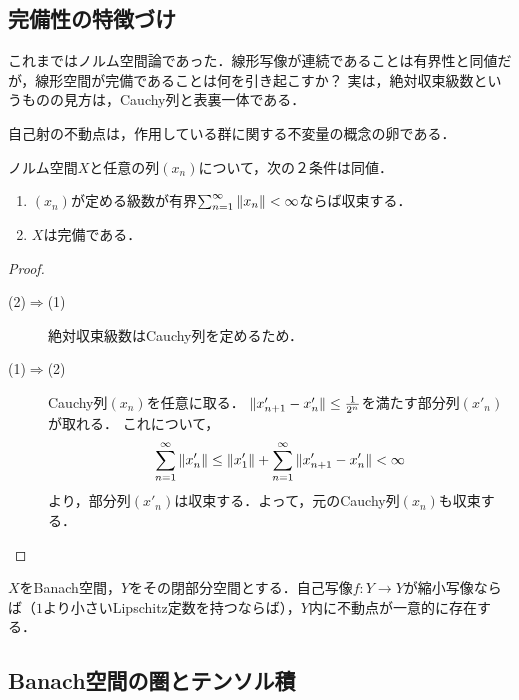 \documentclass[uplatex,dvipdfmx]{jsreport}
\begin{document}
\subsection{完備性の特徴づけ}

\begin{tcolorbox}[colframe=ForestGreen, colback=ForestGreen!10!white,breakable,colbacktitle=ForestGreen!40!white,coltitle=black,fonttitle=\bfseries\sffamily,
title=]
    これまではノルム空間論であった．線形写像が連続であることは有界性と同値だが，線形空間が完備であることは何を引き起こすか？
    実は，絶対収束級数というものの見方は，Cauchy列と表裏一体である．

    自己射の不動点は，作用している群に関する不変量の概念の卵である．
\end{tcolorbox}

\begin{theorem}[絶対収束級数なるクラスの定義]
    ノルム空間$X$と任意の列$(x_n)$について，次の２条件は同値．
    \begin{enumerate}
        \item $(x_n)$が定める級数が有界$\sum^\infty_{n=1}\|x_n\|<\infty$ならば収束する．
        \item $X$は完備である．
    \end{enumerate}
\end{theorem}
\begin{proof}\mbox{}
    \begin{description}
        \item[(2)$\Rightarrow$(1)] 絶対収束級数はCauchy列を定めるため．
        \item[(1)$\Rightarrow$(2)] Cauchy列$(x_n)$を任意に取る．
        $\|x'_{n+1}-x'_n\|\le\frac{1}{2^n}$を満たす部分列$(x'_n)$が取れる．
        これについて，
        \[\sum_{n=1}^\infty\|x'_n\|\le\|x'_1\|+\sum_{n=1}^\infty\|x'_{n+1}-x'_n\|<\infty\]
        より，部分列$(x'_n)$は収束する．よって，元のCauchy列$(x_n)$も収束する．
    \end{description}
\end{proof}

\begin{theorem}
    $X$をBanach空間，$Y$をその閉部分空間とする．自己写像$f:Y\to Y$が縮小写像ならば（$1$より小さいLipschitz定数を持つならば），$Y$内に不動点が一意的に存在する．
\end{theorem}

\subsection{Banach空間の圏とテンソル積}
\end{document}
